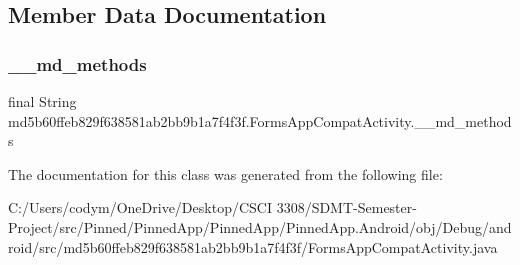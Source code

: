 \subsection{Member Data Documentation}
\mbox{\label{classmd5b60ffeb829f638581ab2bb9b1a7f4f3f_1_1_forms_app_compat_activity_a2cb4fae3ad0f7b38c85c94c344df5089}} 
\subsubsection{\texorpdfstring{\+\_\+\+\_\+md\+\_\+methods}{\_\_md\_methods}}
{\footnotesize\ttfamily final String md5b60ffeb829f638581ab2bb9b1a7f4f3f.\+Forms\+App\+Compat\+Activity.\+\_\+\+\_\+md\+\_\+methods\hspace{0.3cm}{\ttfamily [static]}}



The documentation for this class was generated from the following file\+:\begin{DoxyCompactItemize}
\item 
C\+:/\+Users/codym/\+One\+Drive/\+Desktop/\+C\+S\+C\+I 3308/\+S\+D\+M\+T-\/\+Semester-\/\+Project/src/\+Pinned/\+Pinned\+App/\+Pinned\+App/\+Pinned\+App.\+Android/obj/\+Debug/android/src/md5b60ffeb829f638581ab2bb9b1a7f4f3f/Forms\+App\+Compat\+Activity.\+java\end{DoxyCompactItemize}
